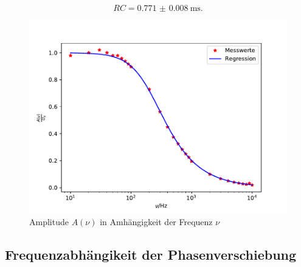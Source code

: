 \begin{equation*}
  RC = \SI{0.771(8)}{\milli\second}.
\end{equation*}

\begin{figure}
  \centering
  \includegraphics[scale = 0.7]{plotB.pdf}
  \caption{Amplitude $A(\nu)$ in Amhängigkeit der Frequenz $\nu$}
  \label{Plot2}
\end{figure}

\subsection{Frequenzabhängikeit der Phasenverschiebung}

